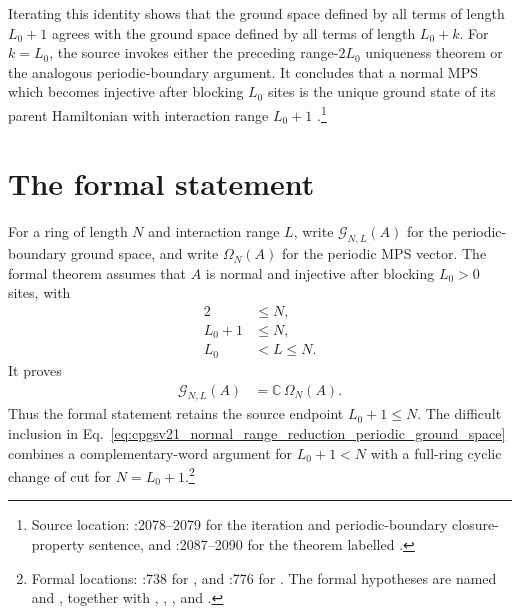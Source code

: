 \documentclass{article}
\begin{document}
Iterating this identity shows that the ground space defined by all terms of
length $L_0+1$ agrees with the ground space defined by all terms of length
$L_0+k$. For $k=L_0$, the source invokes either the preceding range-$2L_0$
uniqueness theorem or the analogous periodic-boundary argument. It concludes
that a normal MPS which becomes injective after blocking $L_0$ sites is the
unique ground state of its parent Hamiltonian with interaction range $L_0+1$
\cite{Cirac2021Matrix}.\footnote{Source location:
:2078--2079 for the iteration and
periodic-boundary closure-property sentence, and
:2087--2090 for the theorem labelled
.}

\section{The formal statement}

For a ring of length $N$ and interaction range $L$, write
$\mathcal G_{N,L}(A)$ for the periodic-boundary ground space, and write
$\Omega_N(A)$ for the periodic MPS vector. The formal theorem assumes that
$A$ is normal and injective after blocking $L_0>0$ sites, with
\begin{align}
    2 &\leq N,
    \label{eq:cpgsv21_normal_range_reduction_ring_lower_bound}\\
    L_0+1 &\leq N,
    \label{eq:cpgsv21_normal_range_reduction_source_endpoint}\\
    L_0 &< L\leq N.
    \label{eq:cpgsv21_normal_range_reduction_interaction_range}
\end{align}
It proves
\begin{align}
    \mathcal G_{N,L}(A)
        &= \mathbb C\,\Omega_N(A).
    \label{eq:cpgsv21_normal_range_reduction_periodic_ground_space}
\end{align}
Thus the formal statement retains the source endpoint $L_0+1\leq N$. The
difficult inclusion in
Eq.~\ref{eq:cpgsv21_normal_range_reduction_periodic_ground_space} combines a
complementary-word argument for $L_0+1<N$ with a full-ring cyclic change of cut
for $N=L_0+1$.\footnote{Formal locations:
:738 for
,
and
:776 for
. The formal
hypotheses are named  and
, together with
, , , and
.}
\end{document}
